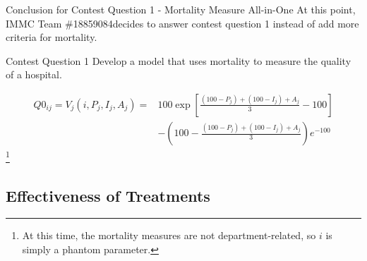 \documentclass[8pt, hyperref={colorlinks=true}]{beamer}
\newcommand{\team}{IMMC Team \#18859084\hphantom{a}}
\begin{document}


\begin{frame}{Conclusion for Contest Question 1 - Mortality Measure All-in-One}
At this point, \team decides to answer contest question 1 instead of add more criteria for mortality.
\begin{block}{Contest Question 1}
Develop a model that uses mortality to measure the quality of a hospital.
\end{block}
\begin{definition}
\begin{align*}
Q0_{ij}=V_j\left(i, P_j, I_j, A_j\right) =& 100\exp\left[\frac{(100-P_j) + (100-I_j) + A_j}{3} - 100\right] \\
& - \left(100 - \frac{(100-P_j) + (100-I_j) + A_j}{3}\right) e^{-100}
\end{align*}\footnote{At this time, the mortality measures are not department-related, so $i$ is simply a phantom parameter.}
\end{definition}
\end{frame}

\subsection{Effectiveness of Treatments}
\end{document}
